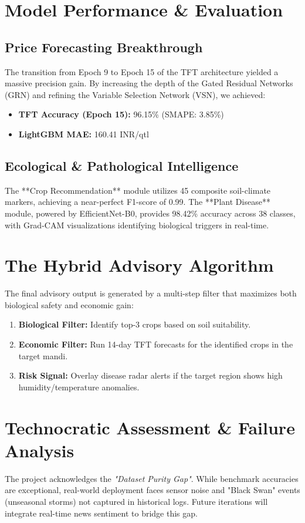 \documentclass[conference]{IEEEtran}
\begin{document}
\section{Model Performance & Evaluation}

\subsection{Price Forecasting Breakthrough}
The transition from Epoch 9 to Epoch 15 of the TFT architecture yielded a massive precision gain. By increasing the depth of the Gated Residual Networks (GRN) and refining the Variable Selection Network (VSN), we achieved:
\begin{itemize}
    \item \textbf{TFT Accuracy (Epoch 15):} 96.15\% (SMAPE: 3.85\%)
    \item \textbf{LightGBM MAE:} 160.41 INR/qtl
\end{itemize}

\subsection{Ecological & Pathological Intelligence}
The **Crop Recommendation** module utilizes 45 composite soil-climate markers, achieving a near-perfect F1-score of 0.99. The **Plant Disease** module, powered by EfficientNet-B0, provides 98.42\% accuracy across 38 classes, with Grad-CAM visualizations identifying biological triggers in real-time.

\section{The Hybrid Advisory Algorithm}
The final advisory output is generated by a multi-step filter that maximizes both biological safety and economic gain:
\begin{enumerate}
    \item \textbf{Biological Filter:} Identify top-3 crops based on soil suitability.
    \item \textbf{Economic Filter:} Run 14-day TFT forecasts for the identified crops in the target mandi.
    \item \textbf{Risk Signal:} Overlay disease radar alerts if the target region shows high humidity/temperature anomalies.
\end{enumerate}

\section{Technocratic Assessment & Failure Analysis}
The project acknowledges the \textit{"Dataset Purity Gap"}. While benchmark accuracies are exceptional, real-world deployment faces sensor noise and "Black Swan" events (unseasonal storms) not captured in historical logs. Future iterations will integrate real-time news sentiment to bridge this gap.
\end{document}
